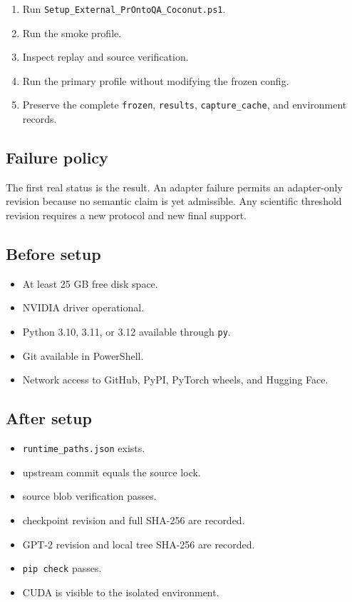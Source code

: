 \documentclass[
  10pt,
]{article}
\providecommand{\tightlist}{%
  \setlength{\itemsep}{0pt}\setlength{\parskip}{0pt}}
\begin{document}
\begin{enumerate}
\def\labelenumi{\arabic{enumi}.}
\tightlist
\item
  Run \texttt{Setup\_External\_PrOntoQA\_Coconut.ps1}.
\item
  Run the smoke profile.
\item
  Inspect replay and source verification.
\item
  Run the primary profile without modifying the frozen config.
\item
  Preserve the complete \texttt{frozen}, \texttt{results},
  \texttt{capture\_cache}, and environment records.
\end{enumerate}

\subsection{Failure policy}\label{failure-policy}

The first real status is the result. An adapter failure permits an
adapter-only revision because no semantic claim is yet admissible. Any
scientific threshold revision requires a new protocol and new final
support.

\subsection{Before setup}\label{before-setup}

\begin{itemize}
\tightlist
\item[$\square$]
  At least 25 GB free disk space.
\item[$\square$]
  NVIDIA driver operational.
\item[$\square$]
  Python 3.10, 3.11, or 3.12 available through \texttt{py}.
\item[$\square$]
  Git available in PowerShell.
\item[$\square$]
  Network access to GitHub, PyPI, PyTorch wheels, and Hugging Face.
\end{itemize}

\subsection{After setup}\label{after-setup}

\begin{itemize}
\tightlist
\item[$\square$]
  \texttt{runtime\_paths.json} exists.
\item[$\square$]
  upstream commit equals the source lock.
\item[$\square$]
  source blob verification passes.
\item[$\square$]
  checkpoint revision and full SHA-256 are recorded.
\item[$\square$]
  GPT-2 revision and local tree SHA-256 are recorded.
\item[$\square$]
  \texttt{pip\ check} passes.
\item[$\square$]
  CUDA is visible to the isolated environment.
\end{itemize}
\end{document}
